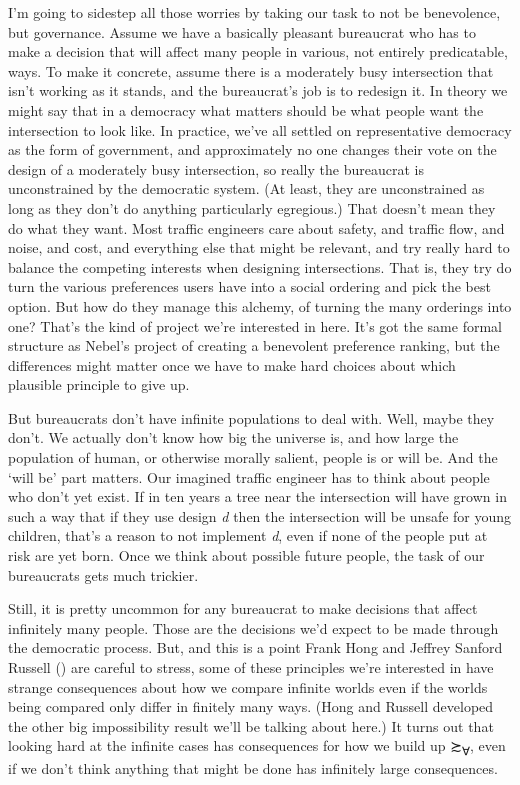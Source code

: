 \documentclass[
  11pt,
  letterpaper,
  DIV=11,
  numbers=noendperiod,
  twoside]{scrartcl}
\begin{document}
I'm going to sidestep all those worries by taking our task to not be
benevolence, but governance. Assume we have a basically pleasant
bureaucrat who has to make a decision that will affect many people in
various, not entirely predicatable, ways. To make it concrete, assume
there is a moderately busy intersection that isn't working as it stands,
and the bureaucrat's job is to redesign it. In theory we might say that
in a democracy what matters should be what people want the intersection
to look like. In practice, we've all settled on representative democracy
as the form of government, and approximately no one changes their vote
on the design of a moderately busy intersection, so really the
bureaucrat is unconstrained by the democratic system. (At least, they
are unconstrained as long as they don't do anything particularly
egregious.) That doesn't mean they do what they want. Most traffic
engineers care about safety, and traffic flow, and noise, and cost, and
everything else that might be relevant, and try really hard to balance
the competing interests when designing intersections. That is, they try
do turn the various preferences users have into a social ordering and
pick the best option. But how do they manage this alchemy, of turning
the many orderings into one? That's the kind of project we're interested
in here. It's got the same formal structure as Nebel's project of
creating a benevolent preference ranking, but the differences might
matter once we have to make hard choices about which plausible principle
to give up.

But bureaucrats don't have infinite populations to deal with. Well,
maybe they don't. We actually don't know how big the universe is, and
how large the population of human, or otherwise morally salient, people
is or will be. And the `will be' part matters. Our imagined traffic
engineer has to think about people who don't yet exist. If in ten years
a tree near the intersection will have grown in such a way that if they
use design \emph{d} then the intersection will be unsafe for young
children, that's a reason to not implement \emph{d}, even if none of the
people put at risk are yet born. Once we think about possible future
people, the task of our bureaucrats gets much trickier.

Still, it is pretty uncommon for any bureaucrat to make decisions that
affect infinitely many people. Those are the decisions we'd expect to be
made through the democratic process. But, and this is a point Frank Hong
and Jeffrey Sanford Russell () are
careful to stress, some of these principles we're interested in have
strange consequences about how we compare infinite worlds even if the
worlds being compared only differ in finitely many ways. (Hong and
Russell developed the other big impossibility result we'll be talking
about here.) It turns out that looking hard at the infinite cases has
consequences for how we build up ≿\textsubscript{∀}, even if we don't
think anything that might be done has infinitely large consequences.
\end{document}

